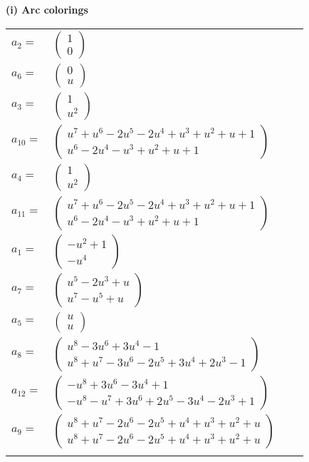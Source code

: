 \documentclass[1p]{elsarticle_modified}
\theoremstyle{definition}
\begin{document}
\flushleft \textbf{(i) Arc colorings}\\
\begin{tabular}{m{7pt} m{180pt} m{7pt} m{180pt} }
\flushright $a_{2}=$&$\begin{pmatrix}1\\0\end{pmatrix}$ \\
\flushright $a_{6}=$&$\begin{pmatrix}0\\u\end{pmatrix}$ \\
\flushright $a_{3}=$&$\begin{pmatrix}1\\u^2\end{pmatrix}$ \\
\flushright $a_{10}=$&$\begin{pmatrix}u^7+u^6-2 u^5-2 u^4+u^3+u^2+u+1\\u^6-2 u^4- u^3+u^2+u+1\end{pmatrix}$ \\
\flushright $a_{4}=$&$\begin{pmatrix}1\\u^2\end{pmatrix}$ \\
\flushright $a_{11}=$&$\begin{pmatrix}u^7+u^6-2 u^5-2 u^4+u^3+u^2+u+1\\u^6-2 u^4- u^3+u^2+u+1\end{pmatrix}$ \\
\flushright $a_{1}=$&$\begin{pmatrix}- u^2+1\\- u^4\end{pmatrix}$ \\
\flushright $a_{7}=$&$\begin{pmatrix}u^5-2 u^3+u\\u^7- u^5+u\end{pmatrix}$ \\
\flushright $a_{5}=$&$\begin{pmatrix}u\\u\end{pmatrix}$ \\
\flushright $a_{8}=$&$\begin{pmatrix}u^8-3 u^6+3 u^4-1\\u^8+u^7-3 u^6-2 u^5+3 u^4+2 u^3-1\end{pmatrix}$ \\
\flushright $a_{12}=$&$\begin{pmatrix}- u^8+3 u^6-3 u^4+1\\- u^8- u^7+3 u^6+2 u^5-3 u^4-2 u^3+1\end{pmatrix}$ \\
\flushright $a_{9}=$&$\begin{pmatrix}u^8+u^7-2 u^6-2 u^5+u^4+u^3+u^2+u\\u^8+u^7-2 u^6-2 u^5+u^4+u^3+u^2+u\end{pmatrix}$\\&\end{tabular}
\end{document}
